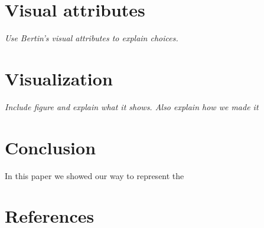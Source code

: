 \documentclass{article}
\begin{document}
\section{Visual attributes}
\textit{Use Bertin's visual attributes to explain choices.}

\section{Visualization}
\textit{Include figure and explain what it shows. Also explain how we made it}

\section{Conclusion}
In this paper we showed our way to represent the 

\section{References}
\end{document}
